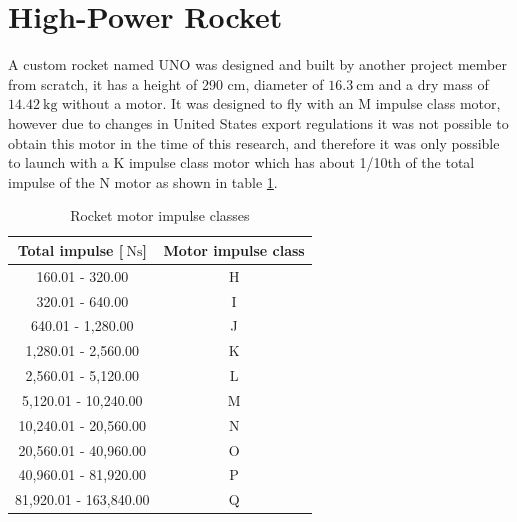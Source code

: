 \documentclass[a4paper,11pt]{article}
\begin{document}



\section{High-Power Rocket}

A custom rocket named UNO was designed and built by another project member from scratch, it has a height of 290 cm, diameter of $\SI{16.3}{\centi\metre}$ and a dry mass of $\SI{14.42}{\kilo\gram}$ without a motor. It was designed to fly with an M impulse class motor, however due to changes in United States export regulations it was not possible to obtain this motor in the time of this research, and therefore it was only possible to launch with a K impulse class motor which has about 1/10th of the total impulse of the N motor as shown in table \ref{tabl:impulseclasses}.

\begin{table}[H]
  \centering
  \label{tabl:impulseclasses}
  \begin{tabular}{|c|c|}
    Total impulse [$\SI{}{\newton\second}$] & Motor impulse class \\
    \hline
    160.01 - 320.00                         & H                   \\
    320.01 - 640.00                         & I                   \\
    640.01 - 1,280.00                       & J                   \\
    1,280.01 - 2,560.00                     & K                   \\
    2,560.01 - 5,120.00                     & L                   \\
    5,120.01 - 10,240.00                    & M                   \\
    10,240.01 - 20,560.00                   & N                   \\
    20,560.01 - 40,960.00                   & O                   \\
    40,960.01 - 81,920.00                   & P                   \\
    81,920.01 - 163,840.00                  & Q                   \\
  \end{tabular}
  \caption{Rocket motor impulse classes \cite{nfpa2018}}
\end{table}
\end{document}
